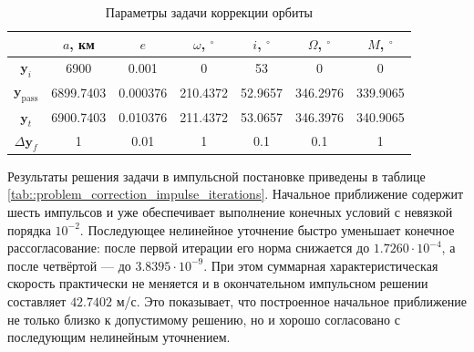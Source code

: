 \begin{table}[!h]
\centering
\caption{Параметры задачи коррекции орбиты}
\label{tab::problem_correction_orb}
\renewcommand{\arraystretch}{1.25}
\begin{tabular}{|c|c|c|c|c|c|c|}
\hline
 & $a$, км & $e$ & $\omega$, $^\circ$ & $i$, $^\circ$ & $\Omega$, $^\circ$ & $M$, $^\circ$ \\
\hline
$\mathbf{y}_i$ 
& 6900 & 0.001 & 0 & 53 & 0 & 0 \\
\hline
$\mathbf{y}_{\text{pass}}$
& 6899.7403 & 0.000376 & 210.4372 & 52.9657 & 346.2976 & 339.9065 \\
\hline
$\mathbf{y}_t$
& 6900.7403 & 0.010376 & 211.4372 & 53.0657 & 346.3976 & 340.9065 \\
\hline
$\Delta \mathbf{y}_f$
& 1 & 0.01 & 1 & 0.1 & 0.1 & 1 \\
\hline
\end{tabular}
\end{table}

Результаты решения задачи в импульсной постановке приведены в таблице \ref{tab::problem_correction_impulse_iterations}. Начальное приближение содержит шесть импульсов и уже обеспечивает выполнение конечных условий с невязкой порядка $10^{-2}$. Последующее нелинейное уточнение быстро уменьшает конечное рассогласование: после первой итерации его норма снижается до $1.7260 \cdot 10^{-4}$, а после четвёртой --- до $3.8395 \cdot 10^{-9}$. При этом суммарная характеристическая скорость практически не меняется и в окончательном импульсном решении составляет $42.7402$ м/с. Это показывает, что построенное начальное приближение не только близко к допустимому решению, но и хорошо согласовано с последующим нелинейным уточнением.

